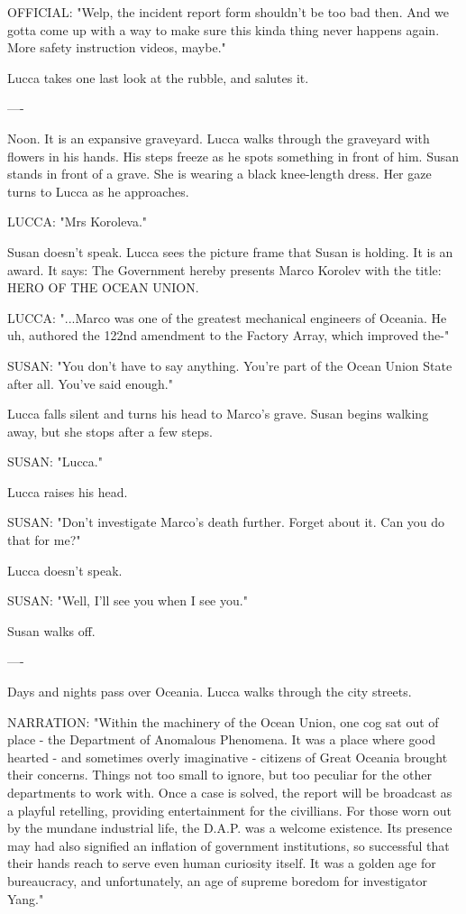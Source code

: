 \documentclass[11pt]{article}
\begin{document}
OFFICIAL: "Welp, the incident report form shouldn't be too bad then. 
And we gotta come up with a way to make sure this kinda thing never happens again. 
More safety instruction videos, maybe."

Lucca takes one last look at the rubble, and salutes it.

----

Noon. It is an expansive graveyard. 
Lucca walks through the graveyard with flowers in his hands. 
His steps freeze as he spots something in front of him. 
Susan stands in front of a grave. She is wearing a black knee-length dress. 
Her gaze turns to Lucca as he approaches. 

LUCCA: "Mrs Koroleva."

Susan doesn't speak. 
Lucca sees the picture frame that Susan is holding. 
It is an award.
It says: The Government hereby presents Marco Korolev with the title: HERO OF THE OCEAN UNION.

LUCCA: "...Marco was one of the greatest mechanical engineers of Oceania. 
He uh, authored the 122nd amendment to the Factory Array, which improved the-"

SUSAN: "You don't have to say anything. You're part of the Ocean Union State after all. You've said enough."

Lucca falls silent and turns his head to Marco's grave. Susan begins walking away, but she stops after a few steps. 

SUSAN: "Lucca."

Lucca raises his head.

SUSAN: "Don't investigate Marco's death further. Forget about it. Can you do that for me?"

Lucca doesn't speak.

SUSAN: "Well, I'll see you when I see you."

Susan walks off.

----

Days and nights pass over Oceania. Lucca walks through the city streets. 

NARRATION: "Within the machinery of the Ocean Union, one cog sat out of place - the Department of Anomalous Phenomena. 
It was a place where good hearted - and sometimes overly imaginative - citizens of Great Oceania brought their concerns. 
Things not too small to ignore, but too peculiar for the other departments to work with. 
Once a case is solved, the report will be broadcast as a playful retelling, providing entertainment for the civillians. 
For those worn out by the mundane industrial life, the D.A.P. was a welcome existence. 
Its presence may had also signified an inflation of government institutions, 
so successful that their hands reach to serve even human curiosity itself. 
It was a golden age for bureaucracy, and unfortunately, an age of supreme boredom for investigator Yang."
\end{document}
